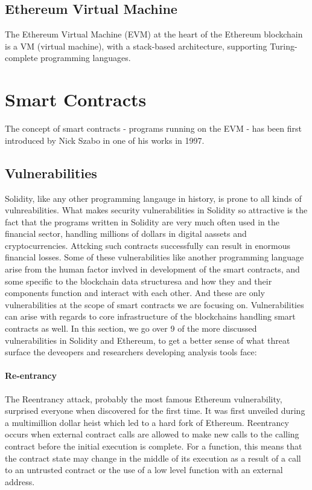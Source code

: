     \subsection{Ethereum Virtual Machine}
        
        The Ethereum Virtual Machine (EVM) at the heart of the Ethereum blockchain is a VM (virtual machine), with a stack-based architecture, supporting Turing-complete programming languages.
        

\section{Smart Contracts}
    The concept of smart contracts - programs running on the EVM - has been first introduced by Nick Szabo in one of his works in 1997.~\cite{szabo1997formalizing}


    \subsection{Vulnerabilities}
        Solidity, like any other programming langauge in history, is prone to all kinds of vulnreabilities.
        What makes security vulnerabilities in Solidity so attractive is the fact that the programs written in Solidity are very much often used in the financial sector,
        handling millions of dollars in digital aassets and cryptocurrencies. Attcking such contracts successfully can result in enormous financial losses.
        Some of these vulnerabilities like another programming language arise from the human factor invlved in development of the smart contracts, and some specific to the blockchain data structuresa and how they and their components function and interact with each other.
        And these are only vulnerabilities at the scope of smart contracts we are focusing on. Vulnerabilities can arise with regards to core infrastructure of the blockchains handling smart contracts as well.
        In this section, we go over 9 of the more discussed vulnerabilities in Solidity and Ethereum, to get a better sense of what threat surface the deveopers and researchers developing analysis tools face:


            \paragraph{Re-entrancy}
            The Reentrancy attack, probably the most famous Ethereum vulnerability, surprised everyone when discovered for the first time.
            It was first unveiled during a multimillion dollar heist which led to a hard fork of Ethereum.
            Reentrancy occurs when external contract calls are allowed to make new calls to the calling contract before the initial execution is complete.
            For a function, this means that the contract state may change in the middle of its execution as a result of a call to an untrusted contract or
            the use of a low level function with an external address.

